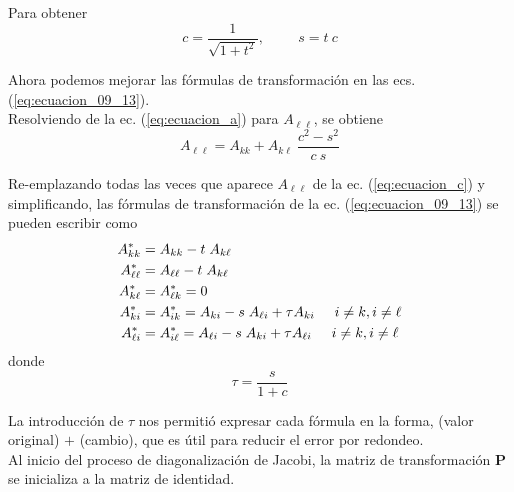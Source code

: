 \begin{frame}
Para obtener
\begin{equation}
c = \dfrac{1}{\sqrt{1 + t^{2}}},\hspace{1cm} s = t \: c
\label{eq:ecuacion_09_17}
\end{equation}
\end{frame}
\begin{frame}
Ahora podemos mejorar las fórmulas de transformación en las ecs. (\ref{eq:ecuacion_09_13}).
\\
\bigskip
Resolviendo de la ec. (\ref{eq:ecuacion_a}) para $A_{\ell \ell}$, se obtiene
\begin{equation}
A_{\ell \ell} = A_{k k} + A_{k \ell} \: \dfrac{c^{2} - s^{2}}{c \: s}
\label{eq:ecuacion_c}
\end{equation}
\end{frame}
\begin{frame}
Re-emplazando todas las veces que aparece $A_{\ell \ell}$ de la ec. (\ref{eq:ecuacion_c}) y simplificando, las fórmulas de transformación de la ec. (\ref{eq:ecuacion_09_13}) se pueden escribir como
\fontsize{12}{12}\selectfont
\begin{align}
\begin{aligned}
A_{k k}^{*} &= A_{k k} - t \; A_{k \ell} \\
A_{\ell \ell}^{*} &= A_{\ell \ell} - t \; A_{k \ell} \\
A_{k \ell}^{*} &= A_{\ell k}^{*} = 0 \\
A_{k i}^{*} &= A_{i k}^{*} = A_{k i} - s \; A_{\ell i} + \tau A_{k i} \hspace{0.5cm} i \neq k, i \neq \ell \\
A_{\ell i}^{*} &= A_{i \ell}^{*} = A_{\ell i} - s \; A_{k i} + \tau A_{\ell i} \hspace{0.5cm} i \neq k, i \neq \ell \\
\end{aligned}
\label{eq:ecuacion_09_18}
\end{align}
\fontsize{14}{14}\selectfont
donde
\fontsize{12}{12}\selectfont
\begin{equation}
\tau = \dfrac{s}{1 + c}
\label{eq:ecuacion_09_19}
\end{equation}
\end{frame}
\begin{frame}
La introducción de $\tau$ nos permitió expresar cada fórmula en la forma, (valor original) $+$ (cambio), que es útil para reducir el error por redondeo.
\\
\bigskip
Al inicio del proceso de diagonalización de Jacobi, la matriz de transformación $\mathbf{P}$ se inicializa a la matriz de identidad.
\end{frame}
